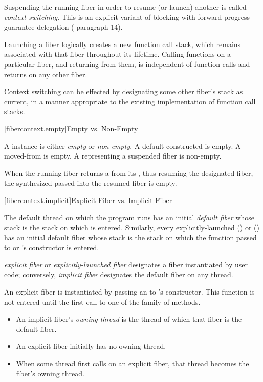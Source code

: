 \para Suspending the running fiber in order to resume (or launch) another is
called \emph{context switching}. This is an explicit variant of blocking with
forward progress guarantee delegation ( paragraph 14).

\para Launching a fiber logically creates a new function call stack, which remains
associated with that fiber throughout its lifetime. Calling functions on a
particular fiber, and returning from them, is independent of function calls
and returns on any other fiber.

\para Context switching can be effected by designating some other fiber's stack as
current, in a manner appropriate to the existing implementation of function call stacks.

[fibercontext.empty]{Empty vs. Non-Empty}

\para A \fiber instance is either \emph{empty} or \emph{non-empty}. A
default-constructed \fiber is empty. A moved-from \fiber is empty. A \fiber
representing a suspended fiber is non-empty.

\para When the running fiber returns a \fiber from its \entryfn, thus resuming the
designated fiber, the synthesized \fiber passed into the resumed fiber is
empty.

[fibercontext.implicit]{Explicit Fiber vs. Implicit Fiber}

\para The default thread on which the program runs \main has an
initial \emph{default fiber} whose stack is the stack on which \main is
entered.  Similarly, every
explicitly-launched  ()
or  () has an initial
default fiber whose stack is the stack on which the function passed
to  or 's constructor is entered.

\para \emph{explicit fiber} or \emph{explicitly-launched fiber}
designates a fiber instantiated by user code; conversely, \emph{implicit fiber}
designates the default fiber on any thread.

\para An explicit fiber is instantiated by passing an \emph{\entryfn} to \fiber's
constructor. This function is not entered until the first call to one of
the  family of methods.

\begin{itemize}
    \item An implicit fiber's \emph{owning thread} is the thread of which that
          fiber is the default fiber.
    \item An explicit fiber initially has no owning thread.
    \item When some thread first calls \anyresume on an explicit fiber, that
          thread becomes the fiber's owning thread.
\end{itemize}

